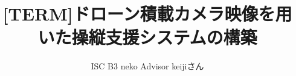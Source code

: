 \documentclass[uplatex,a4j,10pt]{jsarticle}
\begin{document}

\title{[TERM]ドローン積載カメラ映像を用いた操縦支援システムの構築}

\author{
  ISC B3 {neko}
  Advisor {keijiさん}
}

 

\maketitle
\thispagestyle{empty}







\end{document}
